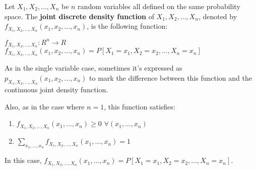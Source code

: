 \documentclass[12pt]{article}
\begin{document}

Let $X_1, X_2, ..., X_n$ be $n$ random variables all defined on the same probability space. The \textbf{joint discrete density function} of $X_1, X_2, ..., X_n$, denoted by $f_{X_1, X_2, ..., X_n}(x_1,x_2,...,x_n)$, is the following function:\\
\par
$f_{X_1, X_2, ..., X_n}: R^n \to R$\\
$f_{X_1, X_2, ..., X_n}(x_1,x_2,...,x_n) = P[X_1 = x_1, X_2 = x_2, ... , X_n = x_n]$\\
\par
As in the single variable case, sometimes it's expressed as $p_{X_1, X_2, ..., X_n}(x_1,x_2,...,x_n)$ to mark the difference between this function and the continuous joint density function.\\
\par
Also, as in the case where $n=1$, this function satisfies:\\
\par
\begin{enumerate}
\item $f_{X_1, X_2, ..., X_n}(x_1,...,x_n) \geq  0$    $\forall (x_1,...,x_n)$
\item $\sum_{x_1, ... ,x_n}^{} {  f_{X_1, X_2, ..., X_n}(x_1,...,x_n) }= 1$
\end{enumerate}
\par
In this case, $f_{X_1, X_2, ..., X_n}(x_1,...,x_n) = P[ X_1 = x_1, X_2 = x_2, ... , X_n = x_n ]$.
\end{document}
